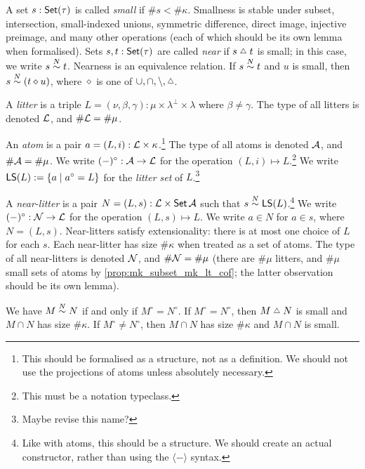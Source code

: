 \begin{definition}[small]
  \label{def:Small}
  A set \( s : \operatorname{\mathsf{Set}}(\tau) \) is called \emph{small} if \( \#s < \#\kappa \).
  Smallness is stable under subset, intersection, small-indexed unions, symmetric difference, direct image, injective preimage, and many other operations (each of which should be its own lemma when formalised).
  Sets \( s, t : \operatorname{\mathsf{Set}}(\tau) \) are called \emph{near} if \( s \symmdiff t \) is small; in this case, we write \( s \mathrel{\overset{N}{\sim}} t \).
  Nearness is an equivalence relation.
  If \( s \mathrel{\overset{N}{\sim}} t \) and \( u \) is small, then \( s \mathrel{\overset{N}{\sim}} (t \mathbin{\diamond} u) \), where \( \diamond \) is one of \( \cup, \cap, \setminus, \symmdiff \).
\end{definition}
\begin{definition}[litter]
  \label{def:Litter}
  A \emph{litter} is a triple \( L = (\nu, \beta, \gamma) : \mu \times \lambda^\bot \times \lambda \) where \( \beta \neq \gamma \).
  The type of all litters is denoted \( {\mathcal L} \), and \( \#{\mathcal L} = \#\mu \).
\end{definition}
\begin{definition}[atom]
  \label{def:Atom}
  An \emph{atom} is a pair \( a = (L, i) : {\mathcal L} \times \kappa \).\footnote{This should be formalised as a structure, not as a definition. We should not use the projections of atoms unless absolutely necessary.}
  The type of all atoms is denoted \( {\mathcal A} \), and \( \#{\mathcal A} = \#\mu \).
  We write \( (-)^\circ : {\mathcal A} \to {\mathcal L} \) for the operation \( (L, i) \mapsto L \).\footnote{This must be a notation typeclass.}
  We write \( \operatorname{\mathsf{LS}}(L) := \{ a \mid a^\circ = L \} \) for the \emph{litter set} of \( L \).\footnote{Maybe revise this name?}
\end{definition}
\begin{definition}
  \label{def:NearLitter}
  A \emph{near-litter} is a pair \( N = (L, s) : {\mathcal L} \times \operatorname{\mathsf{Set}} {\mathcal A} \) such that \( s \mathrel{\overset{N}{\sim}} \operatorname{\mathsf{LS}}(L) \).\footnote{Like with atoms, this should be a structure. We should create an actual constructor, rather than using the \( \langle - \rangle \) syntax.}
  We write \( (-)^\circ : {\mathcal N} \to {\mathcal L} \) for the operation \( (L, s) \mapsto L \).
  We write \( a \in N \) for \( a \in s \), where \( N = (L, s) \).
  Near-litters satisfy extensionality: there is at most one choice of \( L \) for each \( s \).
  Each near-litter has size \( \#\kappa \) when treated as a set of atoms.
  The type of all near-litters is denoted \( {\mathcal N} \), and \( \#{\mathcal N} = \#\mu \) (there are \( \#\mu \) litters, and \( \#\mu \) small sets of atoms by \cref{prop:mk_subset_mk_lt_cof}; the latter observation should be its own lemma).

  We have \( M \mathrel{\overset{N}{\sim}} N \) if and only if \( M^\circ = N^\circ \).
  If \( M^\circ = N^\circ \), then \( M \symmdiff N \) is small and \( M \cap N \) has size \( \#\kappa \).
  If \( M^\circ \neq N^\circ \), then \( M \cap N \) has size \( \#\kappa \) and \( M \cap N \) is small.
\end{definition}
